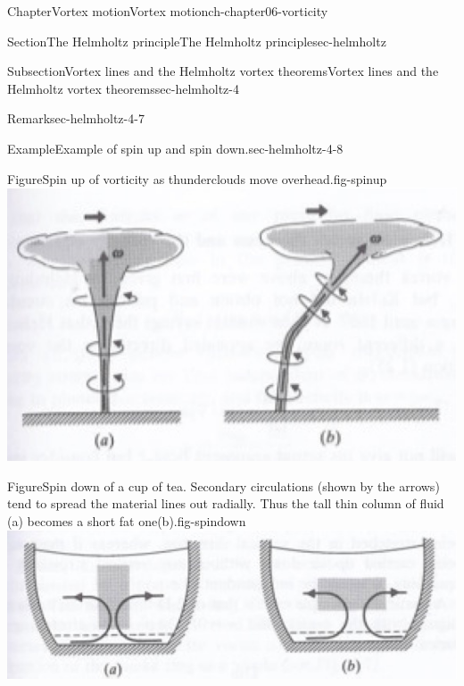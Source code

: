 \documentclass[oneside,10pt,]{book}
\numberwithin{equation}{section}
\begin{document}
\begin{chapterptx}{Chapter}{Vortex motion}{}{Vortex motion}{}{}{ch-chapter06-vorticity}
\begin{sectionptx}{Section}{The Helmholtz principle}{}{The Helmholtz principle}{}{}{sec-helmholtz}
\begin{subsectionptx}{Subsection}{Vortex lines and the Helmholtz vortex theorems}{}{Vortex lines and the Helmholtz vortex theorems}{}{}{sec-helmholtz-4}
\begin{remark}{Remark}{}{sec-helmholtz-4-7}
\end{remark}
\begin{example}{Example}{Example of spin up and spin down.}{sec-helmholtz-4-8}%
\begin{sidebyside}{2}{0}{0}{0}%
\begin{sbspanel}{0.5}%
\begin{panelfigureptx}{Figure}{Spin up of vorticity as thunderclouds move overhead.}{fig-spinup}{}%
\noindent\includegraphics[width=\linewidth]{external/ch-chapter06-spinup.jpg}
\tcblower
\end{panelfigureptx}%
\end{sbspanel}%
\begin{sbspanel}{0.5}%
\begin{panelfigureptx}{Figure}{Spin down of a cup of tea. Secondary circulations (shown by the arrows) tend to spread the material lines out radially. Thus the tall thin column of fluid (a) becomes a short fat one(b).}{fig-spindown}{}%
\noindent\includegraphics[width=\linewidth]{external/ch-chapter06-spindown.jpg}
\tcblower
\end{panelfigureptx}%
\end{sbspanel}%
\end{sidebyside}%
\par

\end{example}
\end{subsectionptx}
\end{sectionptx}
\end{chapterptx}
\end{document}
